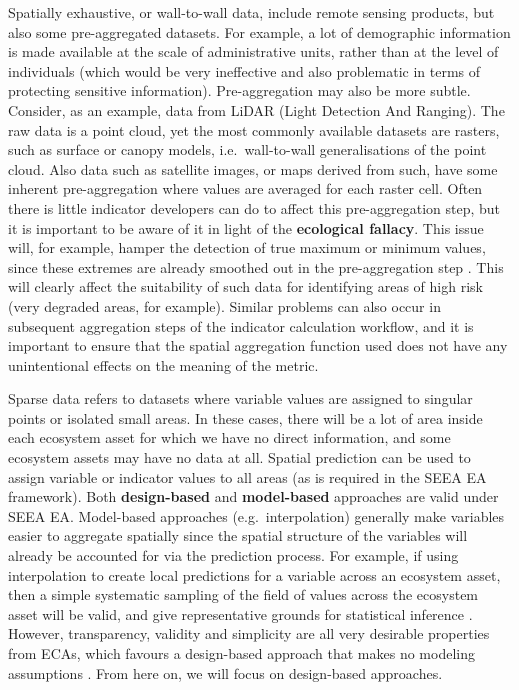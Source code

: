\documentclass[
  authoryear,
  preprint,
  3p]{elsarticle}
\begin{document}
Spatially exhaustive, or wall-to-wall data, include remote sensing
products, but also some pre-aggregated datasets. For example, a lot of
demographic information is made available at the scale of administrative
units, rather than at the level of individuals (which would be very
ineffective and also problematic in terms of protecting sensitive
information). Pre-aggregation may also be more subtle. Consider, as an
example, data from LiDAR (Light Detection And Ranging). The raw data is
a point cloud, yet the most commonly available datasets are rasters,
such as surface or canopy models, i.e.~wall-to-wall generalisations of
the point cloud. Also data such as satellite images, or maps derived
from such, have some inherent pre-aggregation where values are averaged
for each raster cell. Often there is little indicator developers can do
to affect this pre-aggregation step, but it is important to be aware of
it in light of the \textbf{ecological fallacy}. This issue will, for
example, hamper the detection of true maximum or minimum values, since
these extremes are already smoothed out in the pre-aggregation step
\citep{vanbeurden1999}. This will clearly affect the suitability of such
data for identifying areas of high risk (very degraded areas, for
example). Similar problems can also occur in subsequent aggregation
steps of the indicator calculation workflow, and it is important to
ensure that the spatial aggregation function used does not have any
unintentional effects on the meaning of the metric.

Sparse data refers to datasets where variable values are assigned to
singular points or isolated small areas. In these cases, there will be a
lot of area inside each ecosystem asset for which we have no direct
information, and some ecosystem assets may have no data at all. Spatial
prediction can be used to assign variable or indicator values to all
areas (as is required in the SEEA EA framework). Both
\textbf{design-based} and \textbf{model-based} approaches are valid
under SEEA EA. Model-based approaches (e.g.~interpolation) generally
make variables easier to aggregate spatially since the spatial structure
of the variables will already be accounted for via the prediction
process. For example, if using interpolation to create local predictions
for a variable across an ecosystem asset, then a simple systematic
sampling of the field of values across the ecosystem asset will be
valid, and give representative grounds for statistical inference
\citep{brus2021}. However, transparency, validity and simplicity are all
very desirable properties from ECAs, which favours a design-based
approach that makes no modeling assumptions \citep{brus2021}. From here
on, we will focus on design-based approaches.
\end{document}
